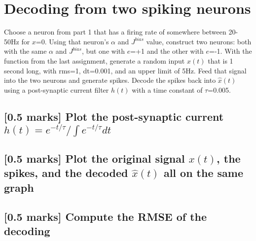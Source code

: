 \documentclass{article}
\begin{document}
\section{Decoding from two spiking neurons}\label{decoding-from-two-spiking-neurons}

Choose a neuron from part 1 that has a firing rate of somewhere between
20-50Hz for $x$=0. Using that neuron's $\alpha$ and $J^{bias}$ value,
construct two neurons: both with the same $\alpha$ and $J^{bias}$, but
one with $e$=+1 and the other with $e$=-1. With the function from the
last assignment, generate a random input $x(t)$ that is 1 second long,
with rms=1, dt=0.001, and an upper limit of 5Hz. Feed that signal into
the two neurons and generate spikes. Decode the spikes back into
$\hat{x}(t)$ using a post-synaptic current filter $h(t)$ with a time
constant of $\tau$=0.005.

\subsection{{[}0.5 marks{]} Plot the post-synaptic current
$h(t)=e^{-t/\tau}/ \int e^{-t/\tau} dt$}

\subsection{{[}0.5 marks{]} Plot the original signal $x(t)$, the spikes,
and the decoded $\hat{x}(t)$ all on the same
graph}\label{marks-plot-the-original-signal-xt-the-spikes-and-the-decoded-hatxt-all-on-the-same-graph}

\subsection{{[}0.5 marks{]} Compute the RMSE of the
decoding}\label{marks-compute-the-rmse-of-the-decoding}
\end{document}
